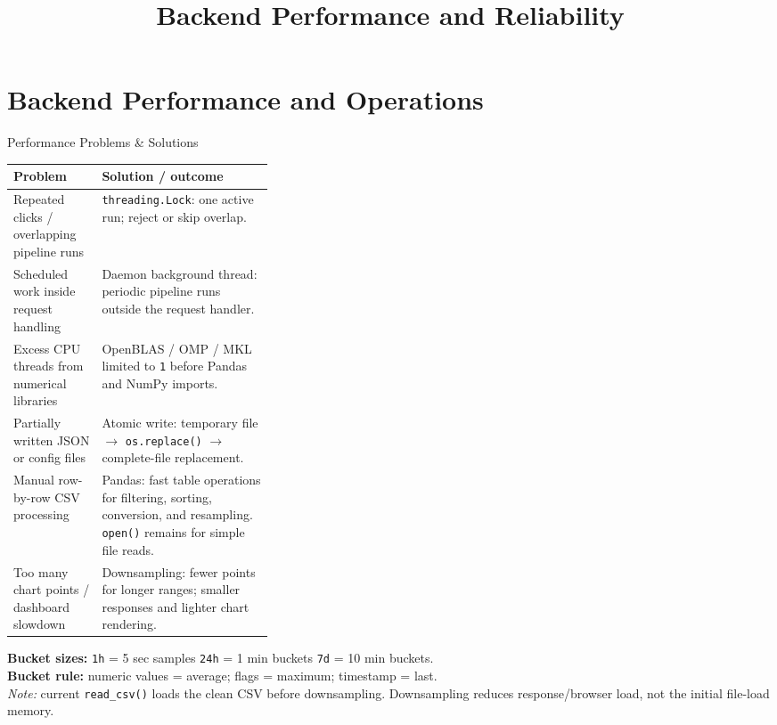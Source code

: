 \documentclass[aspectratio=169,10pt]{beamer}
\title{Backend Performance and Reliability}
\author{}
\date{}
\begin{document}
\section{Backend Performance and Operations}

\begin{frame}{Performance Problems \& Solutions}
\footnotesize
\begin{tabularx}{\linewidth}{@{}L{0.34\linewidth}Y@{}}
\toprule
\textbf{Problem} & \textbf{Solution / outcome} \\
\midrule
Repeated clicks / overlapping pipeline runs
& \texttt{threading.Lock}: one active run; reject or skip overlap. \\
\addlinespace[1mm]
Scheduled work inside request handling
& Daemon background thread: periodic pipeline runs outside the request handler. \\
\addlinespace[1mm]
Excess CPU threads from numerical libraries
& OpenBLAS / OMP / MKL limited to \texttt{1} before Pandas and NumPy imports. \\
\addlinespace[1mm]
Partially written JSON or config files
& Atomic write: temporary file $\rightarrow$ \texttt{os.replace()} $\rightarrow$ complete-file replacement. \\
\addlinespace[1mm]
Manual row-by-row CSV processing
& Pandas: fast table operations for filtering, sorting, conversion, and resampling. \texttt{open()} remains for simple file reads. \\
\addlinespace[1mm]
Too many chart points / dashboard slowdown
& Downsampling: fewer points for longer ranges; smaller responses and lighter chart rendering. \\
\bottomrule
\end{tabularx}

\vspace{2mm}
\scriptsize
\textbf{Bucket sizes:} \texttt{1h} = 5 sec samples \quad
\texttt{24h} = 1 min buckets \quad
\texttt{7d} = 10 min buckets.\\
\textbf{Bucket rule:} numeric values = average; flags = maximum; timestamp = last.\\
\textit{Note:} current \texttt{read\_csv()} loads the clean CSV before downsampling. Downsampling reduces response/browser load, not the initial file-load memory.
\end{frame}
\end{document}
